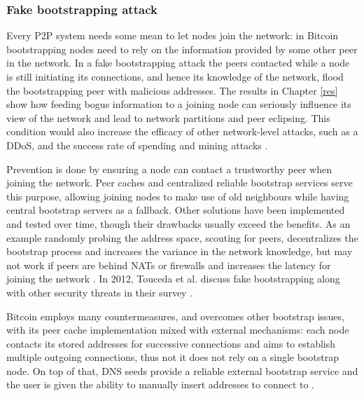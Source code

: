\documentclass[12pt, letterpaper, twoside]{article}
\begin{document}
\subsubsection{Fake bootstrapping attack}\label{fakeboot}
Every P2P system needs some mean to let nodes join the network: in Bitcoin bootstrapping nodes need to rely on the information provided by some other peer in the network. In a fake bootstrapping attack the peers contacted while a node is still initiating its connections, and hence its knowledge of the network, flood the bootstrapping peer with malicious addresses. The results in Chapter \ref{res} show how feeding bogus information to a joining node can seriously influence its view of the network and lead to network partitions and peer eclipsing. This condition would also increase the efficacy of other network-level attacks, such as a DDoS, and the success rate of spending and mining attacks \cite{eclipseatk}.

Prevention is done by ensuring a node can contact a trustworthy peer when joining the network. Peer caches and centralized reliable bootstrap services serve this purpose, allowing joining nodes to make use of old neighbours while having central bootstrap servers as a fallback. Other solutions have been implemented and tested over time, though their drawbacks usually exceed the benefits. As an example randomly probing the address space, scouting for peers, decentralizes the bootstrap process and increases the variance in the network knowledge, but may not work if peers are behind NATs or firewalls and increases the latency for joining the network \cite{decentrbootstrapp2p} \cite{localityaware}. In 2012,  Touceda et al. discuss fake bootstrapping along with other security threats in their survey \cite{toucedafakeboot}.

Bitcoin employs many countermeasures, and overcomes other bootstrap issues, with its peer cache implementation mixed with external mechanisms: each node contacts its stored addresses for successive connections and aims to establish multiple outgoing connections, thus not it does not rely on a single bootstrap node. On top of that, DNS seeds provide a reliable external bootstrap service and the user is given the ability to manually insert addresses to connect to \cite{mahmoud_netsec_boot}.
\end{document}
